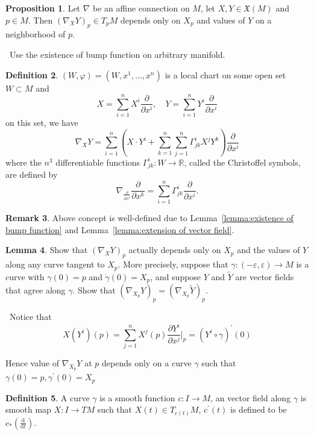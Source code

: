 \documentclass[12pt,a4paper]{book}
\newenvironment{prooff}{{\noindent\it\textcolor{cyan!40!black}{Proof}:}\,}{\par}
\newcommand{\dd}{\text{d}}
\newcommand{\p}{^{\prime}}
\theoremstyle{definition}
\newtheorem{defn}{Definition}[section]
\newtheorem{rema}[defn]{Remark}
\newtheorem{lem}[defn]{Lemma}
\newtheorem{prop}[defn]{Proposition}
\begin{document}
\begin{prop}
    Let $\nabla$ be an affine connection on $M$,
    let $X, Y \in \mathfrak{X}(M)$ and $p \in M$.
    Then $\left(\nabla_X Y\right)_p \in T_p M$ depends only on $X_p$ and values of $Y$ on a neighborhood of $p$.
\end{prop}
\begin{prooff}
    Use the existence of bump function on arbitrary manifold.
\end{prooff}
\begin{defn}
    $(W,\varphi)=(W,x^1,\dots,x^n)$ is a local chart on some open set $W \subset M$ and
    $$
        X=\sum_{i=1}^n X^i \frac{\partial}{\partial x^i}, \quad Y=\sum_{i=1}^n Y^i \frac{\partial}{\partial x^i}
    $$
    on this set, we have
    $$
        \nabla_X Y=\sum_{i=1}^n\left(X \cdot Y^i+\sum_{k=1}^n\sum_{j=1}^n \Gamma_{j k}^i X^j Y^k\right) \frac{\partial}{\partial x^i}
    $$
    where the $n^3$ differentiable functions $\Gamma_{j k}^i: W \rightarrow \mathbb{R}$, called the Christoffel symbols, are defined by
    $$
        \nabla_{\frac{\partial}{\partial x^j}} \frac{\partial}{\partial x^k}=\sum_{i=1}^n \Gamma_{j k}^i \frac{\partial}{\partial x^i} .
    $$
\end{defn}
\begin{rema}
    Above concept is well-defined due to Lemma~\ref{lemma:existence of bump function} and Lemma~\ref{lemma:extension of vector field}.
\end{rema}
\begin{lem}
    Show that $(\nabla_{X} Y)_p$ actually depends only on $X_p$ and the values of $Y$ along any curve tangent to $X_p$.
    More precisely, suppose that $\gamma:(-\varepsilon, \varepsilon) \rightarrow M$ is a curve with $\gamma(0)=p$ and $\dot{\gamma}(0)=X_p$, and suppose $Y$ and $\tilde{Y}$ are vector fields that agree along $\gamma$.
    Show that $(\nabla_{X_p} Y)_p=(\nabla_{X_p} \tilde{Y})_p$.
    \label{lemma:connection, curve, independent}
\end{lem}
\begin{prooff}
    Notice that $$X(Y^i)(p)=\sum_{j=1}^n X^j(p)\frac{\partial Y^i}{\partial x^j}\bigg|_p=(Y^i\circ \gamma)\p (0)$$

    Hence value of $\nabla_{X_p} Y$ at $p$
    depends only on a curve $\gamma$ such that $\gamma(0)=p,\gamma\p(0)=X_p $
\end{prooff}
\begin{defn}
    A curve $\gamma$ is a smooth function $c:I\rightarrow M$, an vector field along $\gamma$ is smooth map $X:I\rightarrow TM$ such that $X(t)\in T_{c(t)}M$, $c\p(t)$ is defined to be $c_{*}(\frac{\dd}{\dd t})$.
\end{defn}
\end{document}
